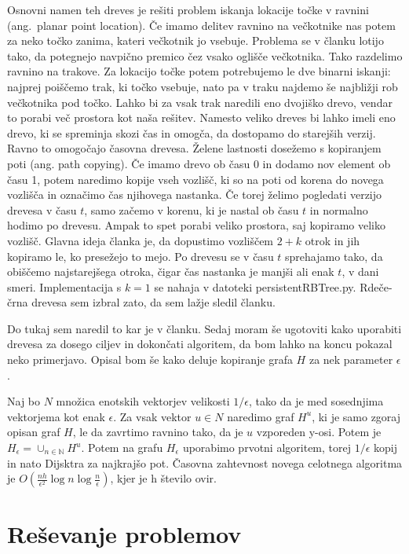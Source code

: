 \documentclass{article}
\begin{document}
Osnovni namen teh dreves je rešiti problem iskanja lokacije točke v ravnini (ang.\ planar point location). Če imamo delitev ravnino na večkotnike nas potem za neko točko zanima, kateri večkotnik jo vsebuje. Problema se v članku lotijo tako, da potegnejo navpično premico čez vsako oglišče večkotnika. Tako razdelimo ravnino na trakove. Za lokacijo točke potem potrebujemo le dve binarni iskanji: najprej poiščemo trak, ki točko vsebuje, nato pa v traku najdemo še najbližji rob večkotnika pod točko. Lahko bi za vsak trak naredili eno dvojiško drevo, vendar to porabi več prostora kot naša rešitev. Namesto veliko dreves bi lahko imeli eno drevo, ki se spreminja skozi čas in omogča, da dostopamo do starejših verzij. Ravno to omogočajo časovna drevesa. Želene lastnosti dosežemo s kopiranjem poti (ang. path copying). Če imamo drevo ob času 0 in dodamo nov element ob času 1, potem naredimo kopije vseh vozlišč, ki so na poti od korena do novega vozlišča in označimo čas njihovega nastanka. Če torej želimo pogledati verzijo drevesa v času $t$, samo začemo v korenu, ki je nastal ob času $t$ in normalno hodimo po drevesu. Ampak to spet porabi veliko prostora, saj kopiramo veliko vozlišč. Glavna ideja članka je, da dopustimo vozliščem $2 + k$ otrok in jih kopiramo le, ko presežejo to mejo. Po drevesu se v času $t$ sprehajamo tako, da obiščemo najstarejšega otroka, čigar čas nastanka je manjši ali enak $t$, v dani smeri. Implementacija s $k = 1$ se nahaja v datoteki persistentRBTree.py. Rdeče-črna drevesa sem izbral zato, da sem lažje sledil članku. 

Do tukaj sem naredil to kar je v članku. Sedaj moram še ugotoviti kako uporabiti drevesa za dosego ciljev in dokončati algoritem, da bom lahko na koncu pokazal neko primerjavo. Opisal bom še kako deluje kopiranje grafa $H$ za nek parameter $\epsilon$.

Naj bo $N$ množica enotskih vektorjev velikosti $1/ \epsilon$, tako da je med sosednjima vektorjema kot enak $\epsilon$. Za vsak vektor $u \in N$ naredimo graf $H^u$, ki je samo zgoraj opisan graf $H$, le da zavrtimo ravnino tako, da je $u$ vzporeden y-osi. Potem je $H_\epsilon = \cup_{n \in \mathbb{N}} H^u$. Potem na grafu $H_\epsilon$ uporabimo prvotni algoritem, torej $1/\epsilon$ kopij in nato Dijsktra za najkrajšo pot. Časovna zahtevnost novega celotnega algoritma je $O(\frac{nh}{\epsilon^2} \log n \log \frac{n}{\epsilon})$, kjer je h število ovir.


\section{Reševanje problemov}
\end{document}
